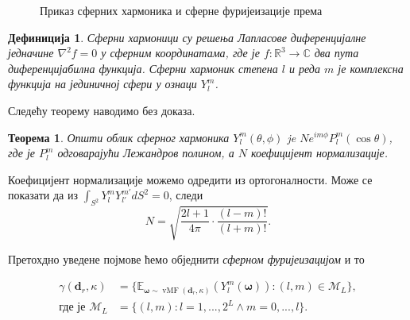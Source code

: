 \documentclass[12pt, a4paper, twoside]{book}
\numberwithin{equation}{chapter}
\newtheorem{theorem}{Теорема}
\numberwithin{theorem}{section}
\newtheorem{definition}{Дефиниција}
\numberwithin{definition}{section}
\numberwithin{definitionChapter}{chapter}
\begin{document}
\begin{figure}[H]
	\begin{center}
	\end{center}
	\caption{Приказ сферних хармоника и сферне фуријеизације према \cite{ref-nerf}}
	\label{fig-refnerf-ide}
\end{figure}

	\begin{definition}
		Сферни хармоници су решења Лапласове диференцијалне једначине $\nabla^2f = 0$ у сферним координатама, где је
		$f:\mathbb{R}^3\rightarrow\mathbb{C}$ два пута диференцијабилна функција. Сферни хармоник степена $l$ и реда
		$m$ је комплексна функција на јединичној сфери у ознаци $Y_{l}^{m}$.
	\end{definition}

Следећу теорему наводимо без доказа.

	\begin{theorem}
		Општи облик сферног хармоника $Y_{l}^{m}(\theta, \phi)$ je $Ne^{im\phi}P_{l}^{m}(\cos\theta)$, где је
		$P_{l}^{m}$ одговарајући Лежандров полином, а $N$ коефицијент нормализације. 
	\end{theorem}

	Коефицијент нормализације можемо одредити из ортогоналности. Може се показати да из
	$\int_{S^2}Y_{l}^{m}Y_{l\prime}^{m\prime}dS^2 = 0$, следи
	$$N = \sqrt{\frac{2l + 1}{4\pi}\cdot\frac{(l-m)!}{(l+m)!}}.$$

Претохдно уведене појмове ћемо обједнити \textit{сферном фуријеизацијом} и то

	\begin{equation}
		\begin{split}
			\gamma(\textbf{d}_r, \kappa) & =
			\{\mathbb{E}_{\boldsymbol{\omega} \sim \operatorname{vMF}(\textbf{d}_r, \kappa)}
			(Y_{l}^{m}(\boldsymbol{\omega})): (l, m) \in \mathcal{M}_L\}, \\
			\text{где је } \mathcal{M}_L & = \{(l, m): l=1, ..., 2^L \land m=0, ..., l\}.
		\end{split}
		\label{eqn-spheric-encoding}
	\end{equation}
\end{document}
